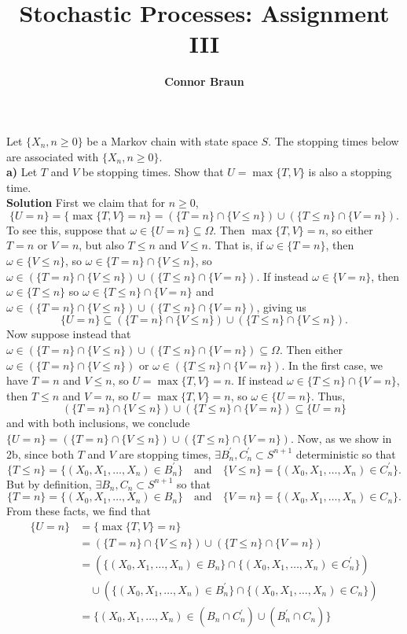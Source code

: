 \documentclass[11pt, letterpaper]{article}
\title{\bf Stochastic Processes: Assignment III}
\author{\bf Connor Braun}
\date{}
\begin{document}
 
    \maketitle
     Let $\{X_n,n\geq 0\}$ be a Markov chain with state space $S$. The stopping times below are associated with $\{X_n,n\geq 0\}$.\\[10pt]
    {\bf a)} Let $T$ and $V$ be stopping times. Show that $U=\max\{T,V\}$ is also a stopping time.\\[10pt]
    {\bf Solution} First we claim that for $n\geq 0$, 
    \[\{U=n\}=\{\max\{T,V\}=n\}=\left(\{T=n\}\cap\{V\leq n\}\right)\cup\left(\{T\leq n\}\cap\{V=n\}\right).\]
    To see this, suppose that $\omega\in\{U=n\}\subseteq\Omega$. Then $\max\{T,V\}=n$, so either $T=n$ or $V=n$, but also $T\leq n$ and $V\leq n$. That is, if $\omega\in\{T=n\}$, then $\omega\in\{V\leq n\}$, so $\omega\in\{T=n\}\cap\{V\leq n\}$, so 
    $\omega\in(\{T=n\}\cap\{V\leq n\})\cup(\{T\leq n\}\cap\{V=n\})$. If instead $\omega\in\{V=n\}$, then $\omega\in\{T\leq n\}$ so $\omega\in\{T\leq n\}\cap\{V=n\}$ and $\omega\in(\{T=n\}\cap\{V\leq n\})\cup(\{T\leq n\}\cap\{V=n\})$, giving us
    \[\{U=n\}\subseteq(\{T=n\}\cap\{V\leq n\})\cup(\{T\leq n\}\cap\{V\leq n\}).\]
    Now suppose instead that $\omega\in(\{T=n\}\cap\{V\leq n\})\cup(\{T\leq n\}\cap\{V=n\})\subseteq\Omega$. Then either $\omega\in(\{T=n\}\cap\{V\leq n\})$ or $\omega\in(\{T\leq n\}\cap\{V=n\})$. In the first case, we have $T=n$ and $V\leq n$, so $U=\max\{T,V\}=n$. If instead
    $\omega\in\{T\leq n\}\cap\{V=n\}$, then $T\leq n$ and $V=n$, so $U=\max\{T,V\}=n$, so $\omega\in\{U=n\}$. Thus,
    \[(\{T=n\}\cap\{V\leq n\})\cup(\{T\leq n\}\cap\{V=n\})\subseteq\{U=n\}\]
    and with both inclusions, we conclude $\{U=n\}=(\{T=n\}\cap\{V\leq n\})\cup(\{T\leq n\}\cap\{V=n\})$. 
    Now, as we show in 2b, since both $T$ and $V$ are stopping times, $\exists B^\prime_n,C^\prime_n\subset S^{n+1}$ deterministic so that
    \[\{T\leq n\}=\{(X_0,X_1,\dots,X_n)\in B^\prime_n\}\quad\text{and}\quad \{V\leq n\}=\{(X_0,X_1,\dots,X_n)\in C^\prime_n\}.\]
    But by definition, $\exists B_n,C_n\subset S^{n+1}$ so that
    \[\{T=n\}=\{(X_0,X_1,\dots,X_n)\in B_n\}\quad\text{and}\quad\{V=n\}=\{(X_0,X_1,\dots,X_n)\in C_n\}.\]
    From these facts, we find that
    \begin{align*}
        \{U=n\}&=\{\max\{T,V\}=n\}\\
        &=(\{T=n\}\cap\{V\leq n\})\cup(\{T\leq n\}\cap\{V=n\})\\
        &=(\{(X_0,X_1,\dots,X_n)\in B_n\}\cap\{(X_0,X_1,\dots,X_n)\in C_n^\prime\})\\
        &\quad\cup(\{(X_0,X_1,\dots,X_n)\in B_n^\prime\}\cap\{(X_0,X_1,\dots,X_n)\in C_n\})\\
        &=\{(X_0,X_1,\dots,X_n)\in (B_n\cap C_n^\prime)\cup(B_n^\prime\cap C_n)\}
    \end{align*}
\end{document}
